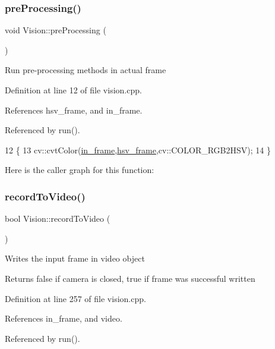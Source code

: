 \subsubsection{\texorpdfstring{pre\+Processing()}{preProcessing()}}
{\footnotesize\ttfamily void Vision\+::pre\+Processing (\begin{DoxyParamCaption}{ }\end{DoxyParamCaption})\hspace{0.3cm}{\ttfamily [private]}}

Run pre-\/processing methods in actual frame 

Definition at line 12 of file vision.\+cpp.



References hsv\+\_\+frame, and in\+\_\+frame.



Referenced by run().


\begin{DoxyCode}
12                            \{
13     cv::cvtColor(\hyperlink{class_vision_a905e6a0333e4931dfd2e0e44b07b51c9}{in\_frame},\hyperlink{class_vision_a1bbcad0a1286863da12d3580492b4a8d}{hsv\_frame},cv::COLOR\_RGB2HSV);
14 \}
\end{DoxyCode}
Here is the caller graph for this function\+:
\mbox{\label{class_vision_a2ce5281f1eb08b71952407ef2a3f5eab}} 
\subsubsection{\texorpdfstring{record\+To\+Video()}{recordToVideo()}}
{\footnotesize\ttfamily bool Vision\+::record\+To\+Video (\begin{DoxyParamCaption}{ }\end{DoxyParamCaption})}

Writes the input frame in video object \begin{DoxyReturn}{Returns}
false if camera is closed, true if frame was successful written 
\end{DoxyReturn}


Definition at line 257 of file vision.\+cpp.



References in\+\_\+frame, and video.



Referenced by run().



